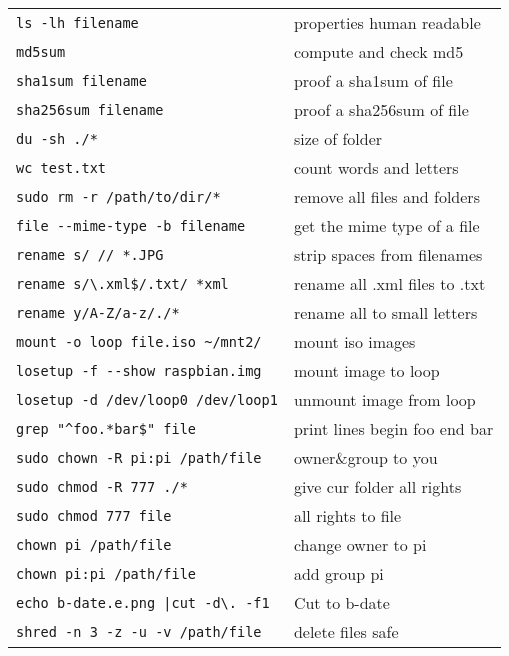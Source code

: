 \documentclass[fontsize=6pt,paper=a4,paper=landscape,twoside=false,parskip=half,
headings=small,numbers=withenddot,usegeometry=true,english]{scrartcl}
\begin{document}
\begin{multicols}{4}
{\begin{tabular}{@{}ll@{}}
		\texttt{ls -lh filename}  &  properties human readable\\
		\texttt{md5sum}  &  compute and check md5\\
		\texttt{sha1sum  filename}  &  proof a sha1sum of file\\
		\texttt{sha256sum filename}  &  proof a sha256sum of file\\
		\texttt{du -sh ./*}  &  size of folder\\
		\texttt{wc test.txt}  &  count words and letters\\
		\texttt{sudo rm -r /path/to/dir/*}  &  remove all files and folders\\
		\texttt{file -{}-mime-type -b filename}  &  get the mime type of a file\\
		\texttt{rename \textquotesingle s/ //\textquotesingle{} *.JPG}  &  strip spaces from filenames\\	
		\texttt{rename \textquotesingle s/\textbackslash.xml\$/.txt/\textquotesingle{}  *xml}  &  rename all .xml files to .txt\\
		\texttt{rename \textquotesingle y/A-Z/a-z/\textquotesingle ./*}  &  rename all to small letters\\	
		\texttt{mount -o loop file.iso \textasciitilde/mnt2/}  &  mount iso images\\
		\texttt{losetup -f -{}-show raspbian.img}  &  mount image to loop\\
		\texttt{losetup -d /dev/loop0 /dev/loop1}  &  unmount image from loop\\
		\texttt{grep "\^{}foo.*bar\$" file}  &  print lines begin foo end bar\\
		\texttt{sudo chown -R pi:pi /path/file}  &  owner\&group to you\\
		\texttt{sudo chmod -R 777 ./*}  &  give cur folder all rights\\
		\texttt{sudo chmod 777 file}  &  all rights to file\\
		\texttt{chown pi /path/file}  &  change owner to pi\\
		\texttt{chown pi:pi /path/file}  &  add group pi\\
		\texttt{echo b-date.e.png |cut -d\textbackslash. -f1}  &  Cut to b-date\\
		\texttt{shred -n 3 -z -u -v /path/file}  &  delete files safe\\
		\bottomrule
	\end{tabular}\\
}
\end{multicols}
\end{document}
